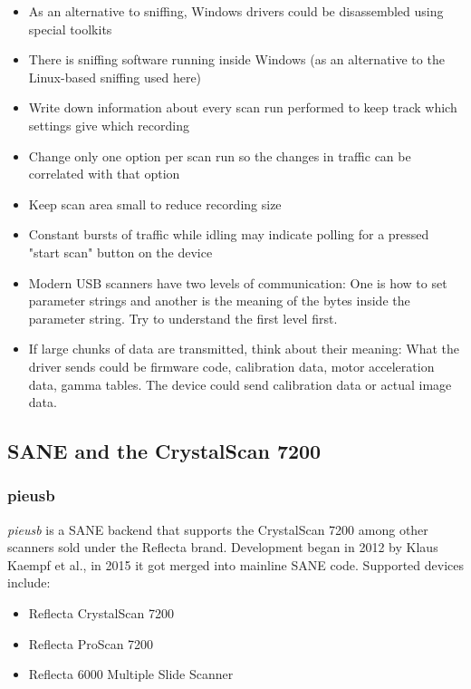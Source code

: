\documentclass{article}
\begin{document}
\begin{itemize}
  \item As an alternative to sniffing, Windows drivers could be disassembled
        using special toolkits
  \item There is sniffing software running inside Windows (as an alternative to
        the Linux-based sniffing used here)
  \item Write down information about every scan run performed to keep track which
        settings give which recording
  \item Change only one option per scan run so the changes in traffic can be correlated
        with that option
  \item Keep scan area small to reduce recording size
  \item Constant bursts of traffic while idling may indicate polling for a pressed "start
        scan" button on the device
  \item Modern USB scanners have two levels of communication: One is how to set parameter
        strings and another is the meaning of the bytes inside the parameter string.
        Try to understand the first level first.
  \item If large chunks of data are transmitted, think about their meaning:
        What the driver sends could be firmware code, calibration data, motor acceleration data, gamma tables. The device could send calibration data or actual image data.
\end{itemize}

\subsection{SANE and the CrystalScan 7200}

\subsubsection{pieusb}

{\it pieusb} is a SANE backend that supports the CrystalScan 7200 among
other scanners sold under the Reflecta brand. Development began
in 2012 by Klaus Kaempf et al., in 2015 it got merged into mainline SANE code.
Supported devices include:

\begin{itemize}
  \item Reflecta CrystalScan 7200
  \item Reflecta ProScan 7200
  \item Reflecta 6000 Multiple Slide Scanner
\end{itemize}
\end{document}
